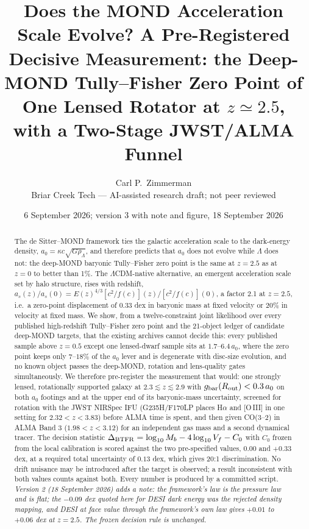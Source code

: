 \documentclass[11pt,letterpaper]{article}
\title{Does the MOND Acceleration Scale Evolve? A Pre-Registered Decisive Measurement: the Deep-MOND Tully--Fisher Zero Point of One Lensed Rotator at $z\simeq2.5$, with a Two-Stage JWST/ALMA Funnel}
\author{Carl P.\ Zimmerman\\ \small Briar Creek Tech --- AI-assisted research draft; not peer reviewed}
\date{6 September 2026; version 3 with note and figure, 18 September 2026}
\begin{document}
\maketitle
\begin{abstract}
The de Sitter--MOND framework ties the galactic acceleration scale to the dark-energy density, $a_0=\kappa c\sqrt{G\rho_\Lambda}$, and therefore predicts that $a_0$ does not evolve while $\Lambda$ does not: the deep-MOND baryonic Tully--Fisher zero point is the same at $z=2.5$ as at $z=0$ to better than 1\%. The $\Lambda$CDM-native alternative, an emergent acceleration scale set by halo structure, rises with redshift, $a_s(z)/a_s(0)=E(z)^{4/3}[c^2/f(c)](z)/[c^2/f(c)](0)$, a factor 2.1 at $z=2.5$, i.e.\ a zero-point displacement of $0.33$ dex in baryonic mass at fixed velocity or $20\%$ in velocity at fixed mass. We show, from a twelve-constraint joint likelihood over every published high-redshift Tully--Fisher zero point and the 21-object ledger of candidate deep-MOND targets, that the existing archives cannot decide this: every published sample above $z=0.5$ except one lensed-dwarf sample sits at $1.7$--$6.4\,a_0$, where the zero point keeps only $7$--$18\%$ of the $a_0$ lever and is degenerate with disc-size evolution, and no known object passes the deep-MOND, rotation and lens-quality gates simultaneously. We therefore pre-register the measurement that would: one strongly lensed, rotationally supported galaxy at $2.3\lesssim z\lesssim2.9$ with $g_{\rm bar}(R_{\rm out})<0.3\,a_0$ on both $a_0$ footings and at the upper end of its baryonic-mass uncertainty, screened for rotation with the JWST NIRSpec IFU (G235H/F170LP places H$\alpha$ and [O\,III] in one setting for $2.32<z<3.83$) before ALMA time is spent, and then given CO(3--2) in ALMA Band 3 ($1.98<z<3.12$) for an independent gas mass and a second dynamical tracer. The decision statistic $\Delta_{\rm BTFR}=\log_{10}M_b-4\log_{10}V_f-C_0$ with $C_0$ frozen from the local calibration is scored against the two pre-specified values, $0.00$ and $+0.33$ dex, at a required total uncertainty of $0.13$ dex, which gives 20:1 discrimination. No drift nuisance may be introduced after the target is observed; a result inconsistent with both values counts against both. Every number is produced by a committed script.
 \emph{Version 2 (18 September 2026) adds a note: the framework's law is the pressure law and is flat; the $-0.09$ dex quoted here for DESI dark energy was the rejected density mapping, and DESI at face value through the framework's own law gives $+0.01$ to $+0.06$ dex at $z=2.5$. The frozen decision rule is unchanged.}
\end{abstract}
\end{document}
